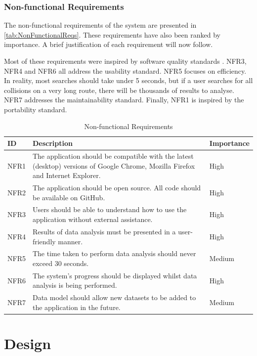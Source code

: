 \documentclass[authoryearcitations]{UoYCSproject}
\begin{document}
\subsection{Non-functional Requirements}

The non-functional requirements of the system are presented in \autoref{tab:NonFunctionalReqs}. These requirements have also been ranked by importance. A brief justification of each requirement will now follow. 

Most of these requirements were inspired by software quality standards \citep{ISO9126}. NFR3, NFR4 and NFR6 all address the usability standard. NFR5 focuses on efficiency. In reality, most searches should take under 5 seconds, but if a user searches for all collisions on a very long route, there will be thousands of results to analyse. NFR7 addresses the maintainability standard. Finally, NFR1 is inspired by the portability standard.

\begin{table}[tbp]
\caption{Non-functional Requirements}
\begin{tabular}{| p{1.5cm} | p{7.5cm} | p{2cm} |}
	\hline
	\textbf{ID} & \textbf{Description} & \textbf{Importance} \\ \hline
	NFR1 & The application should be compatible with the latest (desktop) versions of Google Chrome, Mozilla Firefox and Internet Explorer. & High \\ \hline
	NFR2 & The application should be open source. All code should be available on GitHub. & High \\ \hline
	NFR3 & Users should be able to understand how to use the application without external assistance. & High \\ \hline
	NFR4 & Results of data analysis must be presented in a user-friendly manner. & High \\ \hline
	NFR5 & The time taken to perform data analysis should never exceed 30 seconds. & Medium \\ \hline
	NFR6 & The system's progress should be displayed whilst data analysis is being performed. & High \\ \hline
	NFR7 & Data model should allow new datasets to be added to the application in the future. & Medium \\ \hline
\end{tabular}
\label{tab:NonFunctionalReqs}
\end{table}


\chapter{Design}
\end{document}
